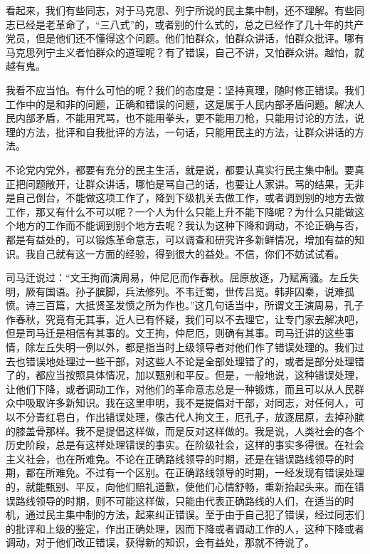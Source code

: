 看起来，我们有些同志，对于马克思、列宁所说的民主集中制，还不理解。有些同志已经是老革命了，“三八式”的，或者别的什么式的，总之已经作了几十年的共产党员，但是他们还不懂得这个问题。他们怕群众，怕群众讲话，怕群众批评。哪有马克思列宁主义者怕群众的道理呢？有了错误，自己不讲，又怕群众讲。越怕，就越有鬼。

我看不应当怕。有什么可怕的呢？我们的态度是：坚持真理，随时修正错误。我们工作中的是和非的问题，正确和错误的问题，这是属于人民内部矛盾问题。解决人民内部矛盾，不能用咒骂，也不能用拳头，更不能用刀枪，只能用讨论的方法，说理的方法，批评和自我批评的方法，一句话，只能用民主的方法，让群众讲话的方法。

不论党内党外，都要有充分的民主生活，就是说，都要认真实行民主集中制。要真正把问题敞开，让群众讲话，哪怕是骂自己的话，也要让人家讲。骂的结果，无非是自己倒台，不能做这项工作了，降到下级机关去做工作，或者调到别的地方去做工作，那又有什么不可以呢？一个人为什么只能上升不能下降呢？为什么只能做这个地方的工作而不能调到别个地方去呢？我认为这种下降和调动，不论正确与否，都是有益处的，可以锻炼革命意志，可以调查和研究许多新鲜情况，增加有益的知识。我自己就有这一方面的经验，得到很大的益处。不信，你们不妨试试看。

司马迁说过：“文王拘而演周易，仲尼厄而作春秋。屈原放逐，乃赋离骚。左丘失明，厥有国语。孙子膑脚，兵法修列。不韦迁蜀，世传吕览。韩非囚秦，说难孤愤。诗三百篇，大抵贤圣发愤之所为作也。”这几句话当中，所谓文王演周易，孔子作春秋，究竟有无其事，近人已有怀疑，我们可以不去理它，让专门家去解决吧，但是司马迁是相信有其事的。文王拘，仲尼厄，则确有其事。司马迁讲的这些事情，除左丘失明一例以外，都是指当时上级领导者对他们作了错误处理的。我们过去也错误地处理过一些干部，对这些人不论是全部处理错了的，或者是部分处理错了的，都应当按照具体情况，加以甄别和平反。但是，一般地说，这种错误处理，让他们下降，或者调动工作，对他们的革命意志总是一种锻炼，而且可以从人民群众中吸取许多新知识。我在这里申明，我不是提倡对干部，对同志，对任何人，可以不分青红皂白，作出错误处理，像古代人拘文王，厄孔子，放逐屈原，去掉孙膑的膝盖骨那样。我不是提倡这样做，而是反对这样做的。我是说，人类社会的各个历史阶段，总是有这样处理错误的事实。在阶级社会，这样的事实多得很。在社会主义社会，也在所难免。不论在正确路线领导的时期，还是在错误路线领导的时期，都在所难免。不过有一个区别。在正确路线领导的时期，一经发现有错误处理的，就能甄别、平反，向他们赔礼道歉，使他们心情舒畅，重新抬起头来。而在错误路线领导的时期，则不可能这样做，只能由代表正确路线的人们，在适当的时机，通过民主集中制的方法，起来纠正错误。至于由于自己犯了错误，经过同志们的批评和上级的鉴定，作出正确处理，因而下降或者调动工作的人，这种下降或者调动，对于他们改正错误，获得新的知识，会有益处，那就不待说了。

